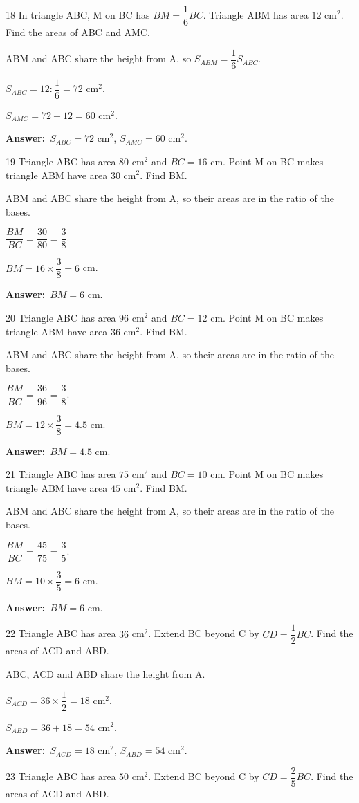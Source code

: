 \documentclass[11pt]{article}
\newif\ifsol \solfalse
\providecommand{\AnsWord}{Đáp số}
\newcommand{\dapso}[1]{\par\textbf{\AnsWord:}\ #1}
\newcommand{\probsol}[1]{%
  \begin{lrbox}{\solmeasure}\begin{minipage}{\dimexpr\linewidth-24pt\relax}#1\end{minipage}\end{lrbox}%
  \ifsol
    \begin{solbox}#1\end{solbox}%
  \else
    \setlength{\solht}{\dimexpr\ht\solmeasure+\dp\solmeasure+0.85cm\relax}%
    \ifdim\solht<1.35cm\setlength{\solht}{1.35cm}\fi
    \begin{tcolorbox}[colback=white,colframe=Line,boxrule=0.8pt,arc=5pt,
      left=8pt,right=8pt,top=4pt,bottom=4pt,height=\solht]{\footnotesize\color{Slate}\itshape\WorkWord}\end{tcolorbox}%
  \fi}
\newcommand{\gap}{\vspace{0.3cm}}
\def\WorkWord{Your work:}
\def\AnsWord{Answer}
\begin{document}
\gap
\begin{probbox}{18}{\relax}
In triangle ABC, M on BC has $BM=\dfrac{1}{6}BC$. Triangle ABM has area $12$ cm$^2$. Find the areas of ABC and AMC.
\end{probbox}
\probsol{
ABM and ABC share the height from A, so $S_{ABM}=\dfrac{1}{6}S_{ABC}$.\par $S_{ABC}=12:\dfrac{1}{6}=72$ cm$^2$.\par $S_{AMC}=72-12=60$ cm$^2$.
\dapso{$S_{ABC}=72$ cm$^2$, $S_{AMC}=60$ cm$^2$.}}
\gap
\begin{probbox}{19}{\relax}
Triangle ABC has area $80$ cm$^2$ and $BC=16$ cm. Point M on BC makes triangle ABM have area $30$ cm$^2$. Find BM.
\end{probbox}
\probsol{
ABM and ABC share the height from A, so their areas are in the ratio of the bases.\par $\dfrac{BM}{BC}=\dfrac{30}{80}=\dfrac{3}{8}$.\par $BM=16\times\dfrac{3}{8}=6$ cm.
\dapso{$BM=6$ cm.}}
\gap
\begin{probbox}{20}{\relax}
Triangle ABC has area $96$ cm$^2$ and $BC=12$ cm. Point M on BC makes triangle ABM have area $36$ cm$^2$. Find BM.
\end{probbox}
\probsol{
ABM and ABC share the height from A, so their areas are in the ratio of the bases.\par $\dfrac{BM}{BC}=\dfrac{36}{96}=\dfrac{3}{8}$.\par $BM=12\times\dfrac{3}{8}=4.5$ cm.
\dapso{$BM=4.5$ cm.}}
\gap
\begin{probbox}{21}{\relax}
Triangle ABC has area $75$ cm$^2$ and $BC=10$ cm. Point M on BC makes triangle ABM have area $45$ cm$^2$. Find BM.
\end{probbox}
\probsol{
ABM and ABC share the height from A, so their areas are in the ratio of the bases.\par $\dfrac{BM}{BC}=\dfrac{45}{75}=\dfrac{3}{5}$.\par $BM=10\times\dfrac{3}{5}=6$ cm.
\dapso{$BM=6$ cm.}}
\gap
\begin{probbox}{22}{\relax}
Triangle ABC has area $36$ cm$^2$. Extend BC beyond C by $CD=\dfrac12BC$. Find the areas of ACD and ABD.
\end{probbox}
\probsol{
ABC, ACD and ABD share the height from A.\par $S_{ACD}=36\times\dfrac{1}{2}=18$ cm$^2$.\par $S_{ABD}=36+18=54$ cm$^2$.
\dapso{$S_{ACD}=18$ cm$^2$, $S_{ABD}=54$ cm$^2$.}}
\gap
\begin{probbox}{23}{\relax}
Triangle ABC has area $50$ cm$^2$. Extend BC beyond C by $CD=\dfrac25BC$. Find the areas of ACD and ABD.
\end{probbox}
\end{document}
